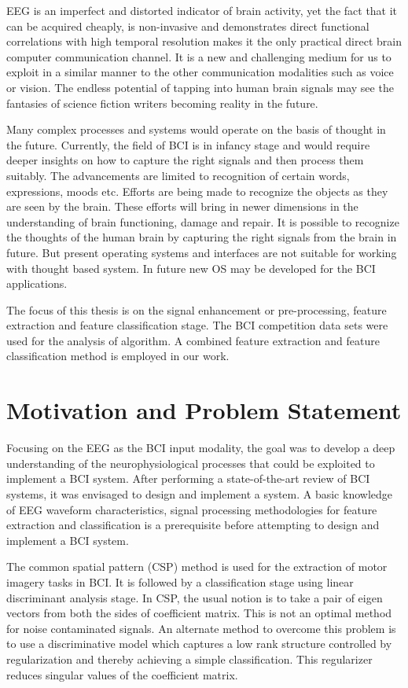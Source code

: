 EEG is an imperfect and distorted indicator of brain activity, yet the fact that it can be acquired cheaply, is non-invasive and demonstrates direct functional correlations with high temporal resolution makes it the only practical direct brain computer communication channel. It is a new and challenging medium for us to exploit in a similar manner to the other communication modalities such as voice or vision. The endless potential of tapping into human brain signals may see the fantasies of science fiction writers becoming reality in the future.

Many complex processes and systems would operate on the basis of thought in the future. Currently, the field of BCI is in infancy stage and would require deeper insights on how to capture the right signals and then process them suitably. The advancements are limited to recognition of certain words, expressions, moods etc. Efforts are being made to recognize the objects as they are seen by the brain. These efforts will bring in newer dimensions in the understanding of brain functioning, damage and repair. It is possible to recognize the thoughts of the human brain by capturing the right signals from the brain in future. But present operating systems and interfaces are not suitable for working with thought based system. In future new OS may be developed for the BCI applications.

The focus of this thesis is on the signal enhancement or pre-processing, feature extraction and feature classification stage. The BCI competition data sets were used for the analysis of algorithm. A combined feature extraction and feature classification method is employed in our work. 



\section{Motivation and Problem Statement}

Focusing on the EEG as the BCI input modality, the goal was to develop a deep understanding of the neurophysiological processes that could be exploited to implement a BCI system. After performing a state-of-the-art review of BCI systems, it was envisaged to design and implement a system. A basic knowledge of EEG waveform characteristics, signal processing methodologies for feature extraction and classification is a prerequisite before attempting to design and implement a BCI system. 

The common spatial pattern (CSP) method is used for the extraction of motor imagery tasks in BCI. It is followed by a classification stage using linear discriminant analysis stage. In CSP, the usual notion is to take a pair of eigen vectors from both the sides of coefficient matrix. This is not an optimal method for noise contaminated signals. An alternate method to overcome this problem is to use a discriminative model which captures a low rank structure controlled by regularization and thereby achieving a simple classification. This regularizer reduces singular values of the coefficient matrix.

